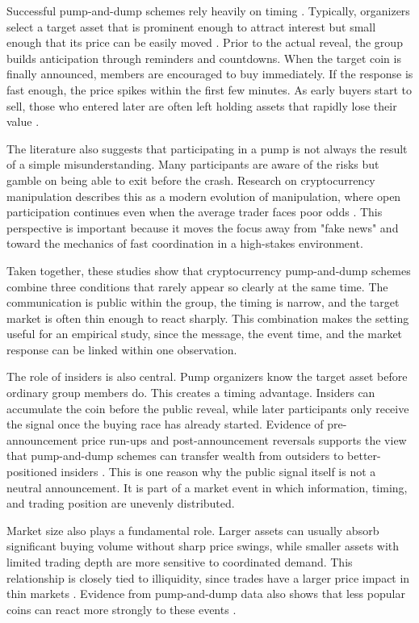 Successful pump-and-dump schemes rely heavily on timing \cite{kamps2018pump, xu2019anatomy}. Typically, organizers select a target asset that is prominent enough to attract interest but small enough that its price can be easily moved \cite{hamrick2021examination, charfeddine2024drives}. Prior to the actual reveal, the group builds anticipation through reminders and countdowns. When the target coin is finally announced, members are encouraged to buy immediately. If the response is fast enough, the price spikes within the first few minutes. As early buyers start to sell, those who entered later are often left holding assets that rapidly lose their value \cite{li2021cryptocurrency, dhawan2023new}.

The literature also suggests that participating in a pump is not always the result of a simple misunderstanding. Many participants are aware of the risks but gamble on being able to exit before the crash. Research on cryptocurrency manipulation describes this as a modern evolution of manipulation, where open participation continues even when the average trader faces poor odds \cite{dhawan2023new}. This perspective is important because it moves the focus away from "fake news" and toward the mechanics of fast coordination in a high-stakes environment.

Taken together, these studies show that cryptocurrency pump-and-dump schemes combine three conditions that rarely appear so clearly at the same time. The communication is public within the group, the timing is narrow, and the target market is often thin enough to react sharply. This combination makes the setting useful for an empirical study, since the message, the event time, and the market response can be linked within one observation.

The role of insiders is also central. Pump organizers know the target asset before ordinary group members do. This creates a timing advantage. Insiders can accumulate the coin before the public reveal, while later participants only receive the signal once the buying race has already started. Evidence of pre-announcement price run-ups and post-announcement reversals supports the view that pump-and-dump schemes can transfer wealth from outsiders to better-positioned insiders \cite{li2021cryptocurrency}. This is one reason why the public signal itself is not a neutral announcement. It is part of a market event in which information, timing, and trading position are unevenly distributed.

Market size also plays a fundamental role. Larger assets can usually absorb significant buying volume without sharp price swings, while smaller assets with limited trading depth are more sensitive to coordinated demand. This relationship is closely tied to illiquidity, since trades have a larger price impact in thin markets \cite{amihud2002illiquidity}. Evidence from pump-and-dump data also shows that less popular coins can react more strongly to these events \cite{hamrick2021examination}.

